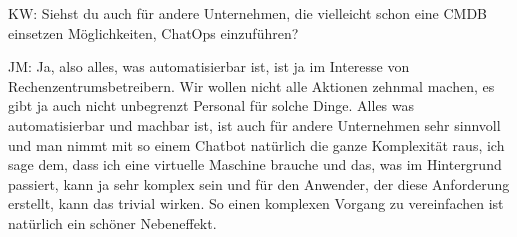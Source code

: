 \begin{list}{X:}{\setlength{\labelsep}{5mm}}
\item[KW:] Siehst du auch für andere Unternehmen, die vielleicht schon eine CMDB einsetzen Möglichkeiten, ChatOps einzuführen?
\item[JM:] Ja, also alles, was automatisierbar ist, ist ja im Interesse von Rechenzentrumsbetreibern. Wir wollen nicht alle Aktionen zehnmal machen, es gibt ja auch nicht unbegrenzt Personal für solche Dinge. Alles was automatisierbar und machbar ist, ist auch für andere Unternehmen sehr sinnvoll und man nimmt mit so einem Chatbot natürlich die ganze Komplexität raus, ich sage dem, dass ich eine virtuelle Maschine brauche und das, was im Hintergrund passiert, kann ja sehr komplex sein und für den Anwender, der diese Anforderung erstellt, kann das trivial wirken. So einen komplexen Vorgang zu vereinfachen ist natürlich ein schöner Nebeneffekt.
\end{list}

